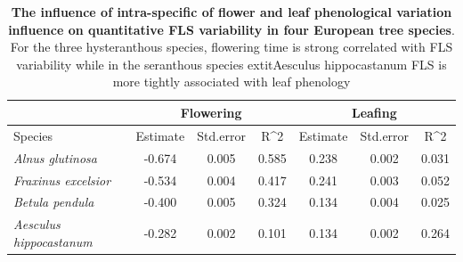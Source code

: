\documentclass[12pt]{article}\usepackage[]{graphicx}\usepackage[]{color}
\begin{document}
\begin{table}[ht]
\centering
\begin{tabular}{lcc|c||cc|c}
  & \multicolumn{3}{c}{Flowering} & \multicolumn{3}{c}{Leafing}\\
 \hline
Species & Estimate & Std.error & R^2 & Estimate & Std.error & R^2 \\ 
  \hline
\textit{Alnus glutinosa} & -0.674 & 0.005 & 0.585 & 0.238 & 0.002 & 0.031 \\ 
  \textit{Fraxinus excelsior} & -0.534 & 0.004 & 0.417 & 0.241 & 0.003 & 0.052 \\ 
  \textit{Betula pendula} & -0.400 & 0.005 & 0.324 & 0.134 & 0.004 & 0.025 \\ 
  \textit{Aesculus hippocastanum} & -0.282 & 0.002 & 0.101 & 0.134 & 0.002 & 0.264 \\ 
   \hline
\end{tabular}
\caption{\textbf{The influence of intra-specific of flower and leaf phenological variation influence on quantitative FLS variability in four European tree species}. For the three hysteranthous species, flowering time is strong correlated with FLS variability while in the seranthous species 	extit{Aesculus hippocastanum} FLS is more tightly associated with leaf phenology} 
\label{tab:Table S2}
\end{table}
\end{document}
